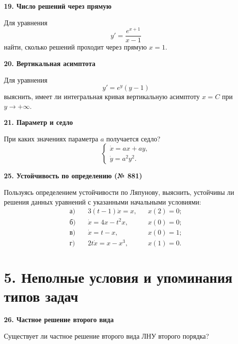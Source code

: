 \documentclass[11pt,a4paper]{article}
\newcommand{\sect}[1]{\Needspace{85mm}\section*{\color{accent}#1}}
\newcommand{\task}[2]{\par\vspace{6pt}
 {\bfseries\color{accent}#1. #2}\par}
\begin{document}
\begin{minipage}[t]{\linewidth}
\task{19}{Число решений через прямую}
Для уравнения
\[
 y'=\frac{e^{x+1}}{x-1}
\]
найти, сколько решений проходит через прямую $x=1$.
\end{minipage}\par\vspace{6pt}

\begin{minipage}[t]{\linewidth}
\task{20}{Вертикальная асимптота}
Для уравнения
\[
 y'=e^y(y-1)
\]
выяснить, имеет ли интегральная кривая вертикальную асимптоту $x=C$
при $y\to+\infty$.
\end{minipage}\par\vspace{6pt}

\begin{minipage}[t]{\linewidth}
\task{21}{Параметр и седло}
При каких значениях параметра $a$ получается седло?
\[
 \begin{cases}
 \dot x=ax+ay,\\
 \dot y=a^2y^2.
 \end{cases}
\]
\end{minipage}\par\vspace{6pt}

\begin{minipage}[t]{\linewidth}
\task{25}{Устойчивость по определению (№ 881)}
Пользуясь определением устойчивости по Ляпунову, выяснить, устойчивы ли
решения данных уравнений с указанными начальными условиями:
\[
\begin{aligned}
 \text{а)}\quad &3(t-1)\dot x=x,       &&x(2)=0;\\[5pt]
 \text{б)}\quad &\dot x=4x-t^2x,      &&x(0)=0;\\[5pt]
 \text{в)}\quad &\dot x=t-x,          &&x(0)=1;\\[5pt]
 \text{г)}\quad &2t\dot x=x-x^3,      &&x(1)=0.
\end{aligned}
\]
\end{minipage}\par\vspace{6pt}

\sect{5. Неполные условия и упоминания типов задач}

\begin{minipage}[t]{\linewidth}
\task{26}{Частное решение второго вида}
Существует ли частное решение второго вида ЛНУ второго порядка?
\end{minipage}\par\vspace{6pt}
\end{document}
